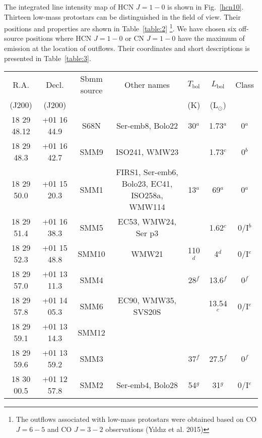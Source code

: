 \documentclass{aa}
\begin{document}
The integrated line intensity map of HCN $J=1-0$ is shown in Fig.~\ref{hcn10}. 
Thirteen low-mass protostars can be distinguished in the field of view. Their positions and properties are shown in Table~\ref{table:2} \footnote{The outflows associated with low-mass protostars were obtained based on CO $J=6-5$ and CO $J=3-2$ observations (Y{\i}ld{\i}z et al. 2015)}. We have chosen six off-source positions where HCN $J=1-0$ or CN $J=1-0$ have the maximum of emission at the location of outflows. Their coordinates and short descriptions is presented in Table~\ref{table:3}.

\begin{table*}
\caption{Catalogue of protostars properties}             %
\label{table:2}      %
\centering                          %
\begin{tabular}{c c c c c c c} 
\hline\hline 
R.A. & Decl. & Sbmm source & Other names & $T_\mathrm{bol}$ &  $L_\mathrm{bol}$  & Class\\
 (J200) & (J200) & & & (K) & (L$_\odot$) & \\
\hline  
18 29 48.12 & +01 16 44.9 & S68N  & Ser-emb8, Bolo22 & 30$^a$ & 1.73$^a$ & 0$^a$\\

18 29 48.3 & +01 16 42.7 & SMM9 & ISO241, WMW23& & 1.73$^c$ & 0$^b$\\

18 29 50.0 & +01 15 20.3 & SMM1 & FIRS1, Ser-emb6, Bolo23, EC41, ISO258a, WMW114 & 13$^a$ & 69$^a$ & 0$^a$\\

18 29 51.4 & +01 16 38.3 & SMM5 & EC53, WMW24, Ser p3 & & 1.62$^c$ & 0/I$^b$\\

18 29 52.3 & +01 15 48.8 & SMM10 & WMW21 & 110$^d$ & 4$^d$ & 0/I$^e$\\

18 29 57.0 & +01 13 11.3 & SMM4 & & 28$^f$ & 13.6$^f$ & 0$^f$\\

18 29 57.8 & +01 14 05.3 & SMM6 & EC90, WMW35, SVS20S & & 13.54$^c$ & 0/I$^e$\\

18 29 59.1 & +01 13 14.3 & SMM12 & & &  & \\

18 29 59.6 & +01 13 59.2 & SMM3 & & 37$^f$ & 27.5$^f$ & 0$^f$\\

18 30 00.5 & +01 12 57.8 & SMM2 & Ser-emb4, Bolo28 & 54$^g$ & 31$^g$ & 0/I$^e$\\


\end{tabular}
\end{table*}
\end{document}
